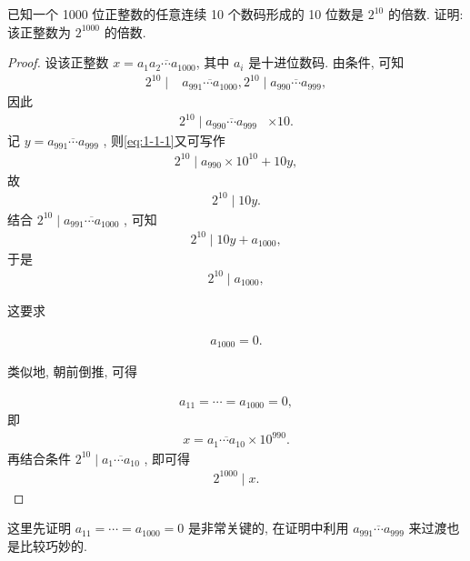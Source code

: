 \begin{example}
	已知一个 1000 位正整数的任意连续 10 个数码形成的 10 位数是 $2^{10}$ 的倍数. 证明: 该正整数为 $2^{1000}$ 的倍数.
\end{example}
\begin{proof}
	设该正整数 $x=\overline{a_{1} a_{2} \cdots a_{1000}}$, 其中 $a_{i}$ 是十进位数码. 由条件, 可知
	\begin{align}
		2^{10} \mid & \overline{a_{991} \cdots a_{1000}}, 2^{10} \mid \overline{a_{990} \cdots a_{999}},
	\end{align}
	因此
	\begin{align}\label{eq:1-1-1}
		2^{10} \mid \overline{a_{990} \cdots a_{999}} & \times 10.
	\end{align}
	记 $y=\overline{a_{991} \cdots a_{999}}$ , 则\autoref{eq:1-1-1}又可写作
\begin{align*}
		2^{10} \mid a_{990} \times 10^{10}+10 y,
	\end{align*}
	故
\begin{align*}
		2^{10} \mid 10 y.
	\end{align*}
	结合 $2^{10} \mid \overline{a_{991} \cdots a_{1000}}$ , 可知
\begin{align*}
		2^{10} \mid 10 y+a_{1000},
	\end{align*}
	于是
\begin{align*}
		2^{10} \mid a_{1000},
	\end{align*}

	这要求
	
\begin{align*}
		a_{1000}=0.
	\end{align*}

	类似地, 朝前倒推, 可得
	
\begin{align*}
		a_{11}=\cdots=a_{1000}=0,
	\end{align*}
	即
\begin{align*}
		x=\overline{a_{1} \cdots a_{10}} \times 10^{990}.
	\end{align*}
	再结合条件 $2^{10} \mid \overline{a_{1} \cdots a_{10}}$ , 即可得
\begin{align*}
		2^{1000} \mid x.
	\end{align*}
\end{proof}
\begin{note}
	这里先证明 $a_{11}=\cdots=a_{1000}=0$ 是非常关键的, 在证明中利用 $\overline{a_{991} \cdots a_{999}}$ 来过渡也是比较巧妙的.
\end{note}

